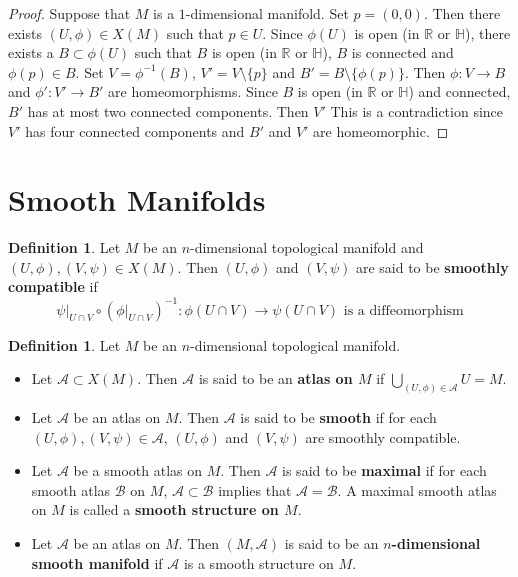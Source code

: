 \documentclass{book}
\theoremstyle{definition}
\newtheorem{defn}[definition]{Definition}
\renewcommand{\H}{\mathbb{H}}
\newcommand{\R}{\mathbb{R}}
\newcommand{\MA}{\mathcal{A}}
\newcommand{\MB}{\mathcal{B}}
\DeclareMathOperator*{\0}{\mbf{0}}
\DeclareMathOperator*{\1}{\mbf{1}}
\newcommand{\tbf}[1]{\textbf{#1}}
\begin{document}
	\begin{proof}
		Suppose that $M$ is a $1$-dimensional manifold. Set $p = (0,0)$. Then there exists $(U, \phi) \in X(M)$ such that $p \in U$. Since $\phi(U)$ is open (in $\R$ or $\H$), there exists a $B \subset \phi(U)$ such that $B$ is open (in $\R$ or $\H$), $B$ is connected and $\phi(p) \in B$. Set $V = \phi^{-1}(B)$, $V' = V \setminus \{p\}$ and $B' = B \setminus \{\phi(p)\}$. Then $\phi: V \rightarrow B$ and $\phi': V' \rightarrow B'$ are homeomorphisms. Since $B$ is open (in $\R$ or $\H$) and connected, $B'$ has at most two connected components. Then $V'$ This is a contradiction since $V'$ has four connected components and $B'$ and $V'$ are homeomorphic. 
	\end{proof}













	
	
	
	
	
	
	
	
	
	
	
	
	\newpage
	\section{Smooth Manifolds}

	\begin{defn}
		Let $M$ be an $n$-dimensional topological manifold and $(U, \phi), (V, \psi) \in X(M)$. Then $(U, \phi)$ and $(V, \psi)$ are said to be \tbf{smoothly compatible} if $$\psi|_{U \cap V} \circ (\phi|_{U \cap V})^{-1}: \phi(U \cap V) \rightarrow \psi (U \cap V) \text{ is a diffeomorphism}$$ 
	\end{defn}

	\begin{defn} Let $M$ be an $n$-dimensional topological manifold.
		\begin{itemize}
			\item Let $\MA \subset X(M)$. Then $\MA$ is said to be an \tbf{atlas on $M$} if  $\bigcup\limits_{(U,\phi) \in \MA} U = M$.
			\item Let $\MA$ be an atlas on $M$. Then $\MA$ is said to be \tbf{smooth} if for each $(U, \phi), (V, \psi) \in \MA$, $(U,\phi)$ and $(V,\psi)$ are smoothly compatible.
			\item Let $\MA$ be a smooth atlas on $M$. Then $\MA$ is said to be \tbf{maximal} if for each smooth atlas $\MB$ on $M$, $\MA \subset \MB$ implies that $\MA = \MB$. A maximal smooth atlas on $M$ is called a \tbf{smooth structure on $M$}.
			\item Let $\MA$ be an atlas on $M$. Then $(M, \MA)$ is said to be an \tbf{$n$-dimensional smooth manifold} if $\MA$ is a smooth structure on $M$. 
		\end{itemize}
	\end{defn}
\end{document}
